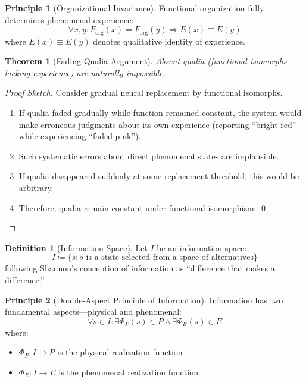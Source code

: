 \documentclass[11pt,a4paper]{article}
\theoremstyle{definition}
\newtheorem{definition}{Definition}[section]
\newtheorem{principle}{Principle}[section]
\theoremstyle{plain}
\newtheorem{theorem}{Theorem}[section]
\theoremstyle{remark}
\newcommand{\Forg}{F_{\text{org}}}
\newcommand{\PhiP}{\Phi_{P}}
\newcommand{\PhiE}{\Phi_{E}}
\begin{document}
\begin{principle}[Organizational Invariance]\label{prin:org_invariance}
Functional organization fully determines phenomenal experience:
\begin{equation}
\boxed{\forall x, y: \Forg(x) = \Forg(y) \Rightarrow E(x) \equiv E(y)}
\end{equation}
where $E(x) \equiv E(y)$ denotes qualitative identity of experience.
\end{principle}

\begin{theorem}[Fading Qualia Argument]
Absent qualia (functional isomorphs lacking experience) are naturally impossible.
\end{theorem}

\begin{proof}[Proof Sketch]
Consider gradual neural replacement by functional isomorphs.
\begin{enumerate}[nosep]
    \item If qualia faded gradually while function remained constant, the system would make erroneous judgments about its own experience (reporting ``bright red'' while experiencing ``faded pink'').
    \item Such systematic errors about direct phenomenal states are implausible.
    \item If qualia disappeared suddenly at some replacement threshold, this would be arbitrary.
    \item Therefore, qualia remain constant under functional isomorphism. \qed
\end{enumerate}
\end{proof}

\begin{definition}[Information Space]
Let $I$ be an information space:
\begin{equation}
I \coloneqq \{ s : s \text{ is a state selected from a space of alternatives} \}
\end{equation}
following Shannon's conception of information as ``difference that makes a difference.''
\end{definition}

\begin{principle}[Double-Aspect Principle of Information]\label{prin:double_aspect}
Information has two fundamental aspects---physical and phenomenal:
\begin{equation}
\boxed{\forall s \in I: \exists \PhiP(s) \in P \land \exists \PhiE(s) \in E}
\end{equation}
where:
\begin{itemize}[nosep]
    \item $\PhiP: I \to P$ is the physical realization function
    \item $\PhiE: I \to E$ is the phenomenal realization function
\end{itemize}
\end{principle}
\end{document}

